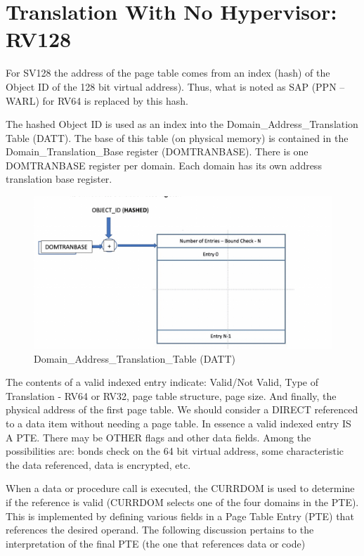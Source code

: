\documentclass{article}
\begin{document}
\section{Translation With No Hypervisor: RV128}

For SV128 the address of the page table comes from an index (hash) of the Object ID of the  128 bit virtual address).  Thus, what is noted as SAP (PPN – WARL) for RV64 is replaced by this  hash. 

The hashed Object ID is used as an index into the Domain\_Address\_Translation Table (DATT).  The base of this table (on physical memory) is contained in the Domain\_Translation\_Base register  (DOMTRANBASE). There is one DOMTRANBASE register per domain.  Each domain has its own address translation base register.

         
\begin{figure}
\includegraphics[scale=.4]{figures/figure4a_datt_translation_table.jpg}
\caption{Domain\_Address\_Translation\_Table (DATT)}
\end{figure}

The contents of a valid indexed entry indicate:  Valid/Not Valid, Type of Translation -  RV64 or RV32,  page table structure,  page size.  And finally, the physical address of the first page table. We should consider a DIRECT referenced to a data item without needing a page table.  In essence a valid indexed entry IS A PTE. There may be OTHER  flags and other data fields.  Among the possibilities are:  bonds check on the 64 bit virtual address,  some characteristic   the data referenced, data is encrypted, etc.


When a data or procedure call is executed,  the CURRDOM is used to determine if the reference is valid (CURRDOM selects one of the four domains in the PTE).  This is implemented by defining various fields in a Page Table Entry  (PTE) that references the desired operand.  The following discussion pertains to the interpretation of the final PTE (the one that references data or code)
\end{document}
